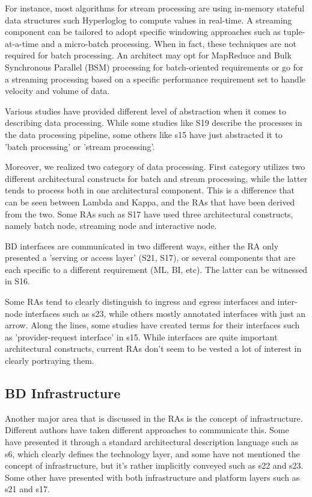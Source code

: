 \documentclass{ieeeaccess}
\begin{document}
For instance, most algorithms for stream processing are using in-memory stateful data structures such Hyperloglog to compute values in real-time. A streaming component can be tailored to adopt specific windowing approaches such as tuple-at-a-time and a micro-batch processing. When in fact, these techniques are not required for batch processing. An architect may opt for MapReduce and Bulk Synchronous Parallel (BSM) processing for batch-oriented requirements or go for a streaming processing based on a specific performance requirement set to handle velocity and volume of data. 

Various studies have provided different level of abstraction when it comes to describing data processing. While some studies like S19 describe the processes in the data processing pipeline, some others like s15 have just abstracted it to 'batch processing' or 'stream processing'. 

Moreover, we realized two category of data processing. First category utilizes two different architectural constructs for batch and stream processing, while the latter tends to process both in one architectural component. This is a difference that can be seen between Lambda and Kappa, and the RAs that have been derived from the two. Some RAs such as S17 have used three architectural constructs, namely batch node, streaming node and interactive node. 

BD interfaces are communicated in two different ways, either the RA only presented a 'serving or access layer' (S21, S17), or several components that are each specific to a different requirement (ML, BI, etc). The latter can be witnessed in S16.

Some RAs tend to clearly distinguish to ingress and egress interfaces and inter-node interfaces such as s23, while others mostly annotated interfaces with just an arrow. Along the lines, some studies have created terms for their interfaces such as 'provider-request interface' in s15. While interfaces are quite important architectural constructs, current RAs don't seem to be vested a lot of interest in clearly portraying them. 

\subsection{BD Infrastructure}

Another major area that is discussed in the RAs is the concept of infrastructure. Different authors have taken different approaches to communicate this. Some have presented it through a standard architectural description language such as s6, which clearly defines the technology layer, and some have not mentioned the concept of infrastructure, but it's rather implicitly conveyed such as s22 and s23. Some other have presented with both infrastructure and platform layers such as s21 and s17. 
\end{document}
